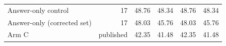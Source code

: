 \begin{table}[t]
{\begin{tabular}{lrrrrr}
Answer-only control & 17 & 48.76 & 48.34 & 48.76 & 48.34 \\
Answer-only (corrected set) & 17 & 48.03 & 45.76 & 48.03 & 45.76 \\
Arm C & published & 42.35 & 41.48 & 42.35 & 41.48 \\

\end{tabular}}
\end{table}
